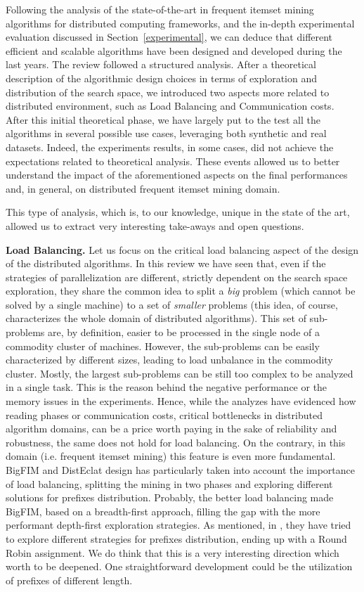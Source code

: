 
Following the analysis of the state-of-the-art in frequent itemset mining
algorithms for distributed computing frameworks, and the in-depth experimental
evaluation discussed in Section~\ref{experimental},
we can deduce that different efficient and scalable
algorithms have been designed and developed during the last years.
The review followed a structured analysis. After a theoretical description of the algorithmic design choices
in terms of exploration and distribution of the search space, we introduced two aspects more related to distributed environment, such as Load Balancing and Communication costs. After this initial theoretical phase, we have largely put to the test all the algorithms in several possible use cases, leveraging both synthetic and real datasets. Indeed, the experiments results, in some cases, did not achieve the expectations related to theoretical analysis. These events allowed us to better understand  the impact of the aforementioned aspects on the final performances and, in general, on distributed frequent itemset mining domain.

This type of analysis, which is, to our knowledge, unique in the state of the art, allowed us to extract very interesting take-aways and open questions. 





\textbf{Load Balancing.}
Let us focus on the critical load balancing aspect of the design of the distributed algorithms. In this review we have seen that, even if the strategies of parallelization are different, strictly dependent on the search space exploration, they share the common idea to split a \textit{big} problem (which cannot be solved by a single machine) to a set of \textit{smaller} problems (this idea, of course, characterizes the whole domain of distributed algorithms). This set of sub-problems are, by definition, easier to be processed in the single node of a commodity cluster of machines. However, the sub-problems can be easily characterized by different sizes, leading to load unbalance in the commodity cluster. Mostly, the largest sub-problems can be still too complex to be analyzed in a single task. This is the reason behind the negative performance or the memory issues in the experiments. 
Hence, while the analyzes have evidenced how reading phases or communication costs, critical bottlenecks in distributed algorithm domains, can be a price worth paying in the sake of reliability and robustness, the same does not hold for load balancing. On the contrary, in this domain (i.e. frequent itemset mining) this feature is even more fundamental. 
BigFIM and DistEclat design has particularly taken into account the importance of load balancing, splitting the mining in two phases and exploring different solutions for prefixes distribution. Probably, the better load balancing made BigFIM, based on a breadth-first approach, filling the gap with the more performant depth-first exploration strategies. 
As mentioned, in \cite{bigfim}, they have tried to explore different strategies for prefixes distribution, ending up with a Round Robin assignment. We do think that this is a very interesting direction which worth to be deepened. One straightforward development could be the utilization of prefixes of different length. 

